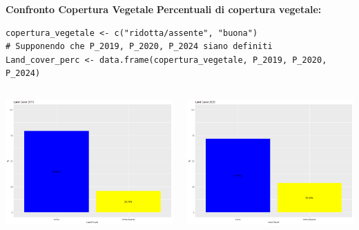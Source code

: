\documentclass{beamer}
\begin{document}
\begin{frame}[fragile]{\textbf{Confronto Copertura Vegetale}}
\textbf{Percentuali di copertura vegetale:}
\begin{lstlisting}
copertura_vegetale <- c("ridotta/assente", "buona")
# Supponendo che P_2019, P_2020, P_2024 siano definiti
Land_cover_perc <- data.frame(copertura_vegetale, P_2019, P_2020, P_2024)
\end{lstlisting}

\begin{columns}
    \centering
    \includegraphics[width=\textwidth]{Percentuali_Land_Cover_2019.png}
    
    \centering
    \includegraphics[width=\textwidth]{Percentuali_Land_Cover_2020.png}
    

\end{columns}
\end{frame}
\end{document}

